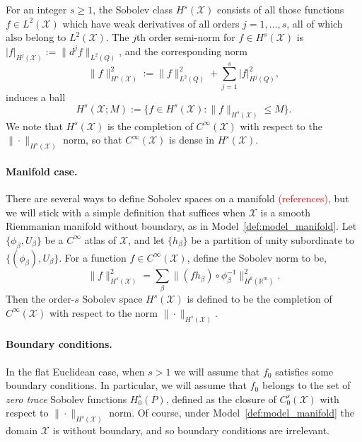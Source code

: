 \documentclass{article}
\newcommand{\Reals}{\mathbb{R}}
\newcommand{\1}{\mathbf{1}}
\newcommand{\Leb}{L}
\newcommand{\mc}[1]{\mathcal{#1}}
\theoremstyle{alden}
\theoremstyle{aldenthm}
\theoremstyle{definition}
\theoremstyle{remark}
\begin{document}
For an integer $s \geq 1$, the Sobolev class $H^s(\mc{X})$ consists of all those functions $f \in \Leb^2(\mc{X})$ which have weak derivatives of all orders $j = 1,\ldots,s$, all of which also belong to $\Leb^2(\mc{X})$. The $j$th order semi-norm for $f \in H^s(\mc{X})$ is $|f|_{H^j(\mc{X})} := \|d^jf\|_{L^2(Q)}$, and the corresponding norm
\begin{equation*}
\|f\|_{H^s(\mc{X})}^2 := \|f\|_{\Leb^2(Q)}^2 + \sum_{j = 1}^{s} |f|_{H^j(Q)}^2,
\end{equation*}
induces a ball
\begin{equation*}
H^s(\mc{X};M) := \bigl\{f \in H^s(\mc{X}): \|f\|_{H^s(\mc{X})} \leq M\bigr\}.
\end{equation*} 
We note that $H^s(\mc{X})$ is the completion of $C^{\infty}(\mc{X})$ with respect to the $\|\cdot\|_{H^s(\mc{X})}$ norm, so that $C^{\infty}(\mc{X})$ is dense in $H^s(\mc{X})$. 

\paragraph{Manifold case.}
There are several ways to define Sobolev spaces on a manifold \textcolor{red}{(references)}, but we will stick with a simple definition that suffices when $\mc{X}$ is a smooth Riemmanian manifold without boundary, as in Model~\ref{def:model_manifold}. Let $\{\phi_{\beta}, U_{\beta}\}$ be a $C^{\infty}$ atlas of $\mc{X}$, and let $\{h_\beta\}$ be a partition of unity subordinate to $\{(\phi_{\beta}), U_{\beta}\}$. For a function $f \in C^{\infty}(\mc{X})$, define the Sobolev norm to be,
\begin{equation*}
\|f\|_{H^s(\mc{X})}^2 = \sum_{\beta} \|(fh_{\beta}) \circ \phi_\beta^{-1}\|_{H^{k}(\Reals^m)}^2.
\end{equation*}
Then the order-$s$ Sobolev space $H^s(\mc{X})$ is defined to be the completion of $C^{\infty}(\mc{X})$ with respect to the norm $\|\cdot\|_{H^s(\mc{X})}$. 

\paragraph{Boundary conditions.}
In the flat Euclidean case, when $s > 1$ we will assume that $f_0$ satisfies some boundary conditions. In particular, we will assume that $f_0$ belongs to the set of \emph{zero trace} Sobolev functions $H_0^{s}(P)$, defined as the closure of $C_0^s(\mc{X})$ with respect to $\|\cdot\|_{H^s(\mc{X})}$ norm. Of course, under Model~\ref{def:model_manifold} the domain $\mc{X}$ is without boundary, and so boundary conditions are irrelevant.
\end{document}
